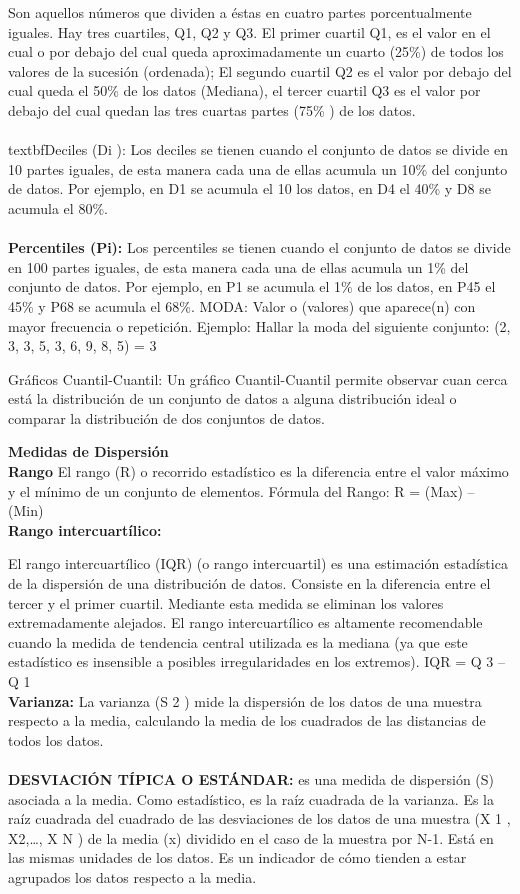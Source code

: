 \documentclass[ebook,12pt,oneside,openany]{memoir}
\begin{document}
Son aquellos números que dividen a éstas en cuatro partes porcentualmente iguales. Hay tres
cuartiles, Q1, Q2 y Q3. El primer cuartil Q1, es el valor en el cual o por debajo del cual queda
aproximadamente un cuarto (25\%) de todos los valores de la sucesión (ordenada); El segundo
cuartil Q2 es el valor por debajo del cual queda el 50\% de los datos (Mediana), el tercer cuartil Q3 es
el valor por debajo del cual quedan las tres cuartas partes (75\% ) de los datos. 
\\\\textbf{Deciles (Di ):}
Los deciles se tienen cuando el conjunto de datos se divide en 10 partes iguales, de esta manera
cada una de ellas acumula un 10\% del conjunto de datos. Por ejemplo, en D1 se acumula el 10%
los datos, en D4 el 40\% y D8 se acumula el 80\%.\\
\\\textbf{Percentiles (Pi):}
Los percentiles se tienen cuando el conjunto de datos se divide en 100 partes iguales, de esta
manera cada una de ellas acumula un 1\% del conjunto de datos. Por ejemplo, en P1 se acumula el
1\% de los datos, en P45 el 45\% y P68 se acumula el 68\%.
MODA: Valor o (valores) que aparece(n) con mayor frecuencia o repetición. Ejemplo: Hallar la moda
del siguiente conjunto:
(2, 3, 3, 5, 3, 6, 9, 8, 5) = 3

Gráficos Cuantil-Cuantil: Un gráfico Cuantil-Cuantil permite observar cuan cerca está la
distribución de un conjunto de datos a alguna distribución ideal o comparar la distribución de dos
conjuntos de datos.

\textbf{Medidas de Dispersión}\\
\textbf{Rango}
El rango (R) o recorrido estadístico es la diferencia entre el valor máximo y el mínimo de un conjunto
de elementos.
Fórmula del Rango: R = (Max) – (Min)\\
\textbf{Rango intercuartílico:}

El rango intercuartílico (IQR) (o rango intercuartil) es una estimación estadística de la dispersión de
una distribución de datos. Consiste en la diferencia entre el tercer y el primer cuartil. Mediante esta
medida se eliminan los valores extremadamente alejados. El rango intercuartílico es altamente
recomendable cuando la medida de tendencia central utilizada es la mediana (ya que este
estadístico es insensible a posibles irregularidades en los extremos).
IQR = Q 3 – Q 1\\

\textbf{Varianza:}
La varianza (S 2 ) mide la dispersión de los datos de una muestra respecto a la media, calculando la
media de los cuadrados de las distancias de todos los datos.\\
\\\textbf{DESVIACIÓN TÍPICA O ESTÁNDAR:} es una medida de dispersión (S) asociada a la media. Como
estadístico, es la raíz cuadrada de la varianza. Es la raíz cuadrada del cuadrado de las desviaciones
de los datos de una muestra (X 1 , X2,…, X N ) de la media (x) dividido en el caso de la muestra por N-1.
Está en las mismas unidades de los datos. Es un indicador de cómo tienden a estar agrupados los
datos respecto a la media.\\
\end{document}
